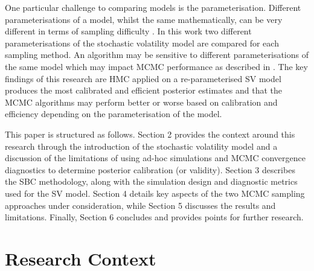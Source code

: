 \documentclass[12pt, a4paper]{article}
\begin{document}
    One particular challenge to comparing models is the parameterisation. Different parameterisations of a model, whilst the same mathematically, can be very different in terms of sampling difficulty \citep{neal2003slice}. In this work two different parameterisations of the stochastic volatility model are compared for each sampling method. An algorithm may be sensitive to different parameterisations of the same model which may impact MCMC performance as described in \citet{strickland2008parameterisation}. The key findings of this research are HMC applied on a re-parameterised SV model produces the most calibrated and efficient posterior estimates and that the MCMC algorithms may perform better or worse based on calibration and efficiency depending on the parameterisation of the model.

    This paper is structured as follows. Section 2 provides the context around this research through the introduction of the stochastic volatility model and a discussion of the limitations of using ad-hoc simulations and MCMC convergence diagnostics to determine posterior calibration (or validity). Section 3 describes the SBC methodology, along with the simulation design and diagnostic metrics used for the SV model. Section 4 details key aspects of the two MCMC sampling approaches under consideration, while Section 5 discusses the results and limitations. Finally, Section 6 concludes and provides points for further research.

\section{Research Context}
\end{document}
